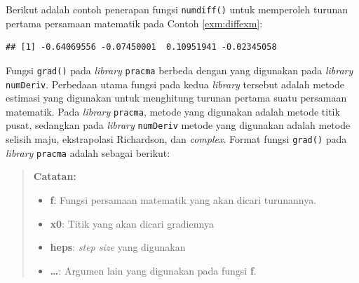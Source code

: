 \documentclass[]{book}
\newenvironment{Shaded}{\begin{snugshade}}{\end{snugshade}}
\newcommand{\ControlFlowTok}[1]{\textcolor[rgb]{0.13,0.29,0.53}{\textbf{#1}}}
\newcommand{\DataTypeTok}[1]{\textcolor[rgb]{0.13,0.29,0.53}{#1}}
\newcommand{\DecValTok}[1]{\textcolor[rgb]{0.00,0.00,0.81}{#1}}
\newcommand{\KeywordTok}[1]{\textcolor[rgb]{0.13,0.29,0.53}{\textbf{#1}}}
\newcommand{\NormalTok}[1]{#1}
\newcommand{\OperatorTok}[1]{\textcolor[rgb]{0.81,0.36,0.00}{\textbf{#1}}}
\providecommand{\tightlist}{%
  \setlength{\itemsep}{0pt}\setlength{\parskip}{0pt}}
\theoremstyle{definition}
\theoremstyle{definition}
\theoremstyle{definition}
\theoremstyle{remark}
\begin{document}
Berikut adalah contoh penerapan fungsi \texttt{numdiff()} untuk memperoleh turunan pertama persamaan matematik pada Contoh \ref{exm:diffexm}:

\begin{Shaded}
\end{Shaded}

\begin{verbatim}
## [1] -0.64069556 -0.07450001  0.10951941 -0.02345058
\end{verbatim}

Fungsi \texttt{grad()} pada \emph{library} \texttt{pracma} berbeda dengan yang digunakan pada \emph{library} \texttt{numDeriv}. Perbedaan utama fungsi pada kedua \emph{library} tersebut adalah metode estimasi yang digunakan untuk menghitung turunan pertama suatu persamaan matematik. Pada \emph{library} \texttt{pracma}, metode yang digunakan adalah metode titik pusat, sedangkan pada \emph{library} \texttt{numDeriv} metode yang digunakan adalah metode selisih maju, ekstrapolasi Richardson, dan \emph{complex}. Format fungsi \texttt{grad()} pada \emph{library} \texttt{pracma} adalah sebagai berikut:

\begin{Shaded}
\end{Shaded}

\begin{quote}
\textbf{Catatan:}

\begin{itemize}
\tightlist
\item
  \textbf{f}: Fungsi persamaan matematik yang akan dicari turunannya.
\item
  \textbf{x0}: Titik yang akan dicari gradiennya
\item
  \textbf{heps}: \emph{step size} yang digunakan
\item
  \textbf{\ldots{}}: Argumen lain yang digunakan pada fungsi \textbf{f}.
\end{itemize}
\end{quote}
\end{document}
